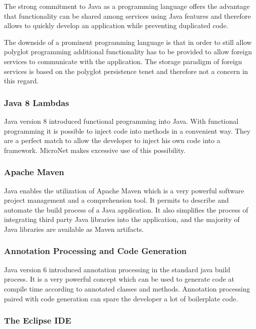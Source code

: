 The strong commitment to Java as a programming language offers the
advantage that functionality can be shared among services using Java features
and therefore allows to quickly develop an application while preventing
duplicated code.

The downside of a prominent programming language is that in order to still allow
polyglot programming additional functionality has to be provided to allow
foreign services to communicate with the application. The storage paradigm of
foreign services is based on the polyglot persistence tenet and therefore not a
concern in this regard.

\subsubsection{Java 8 Lambdas}

Java version 8 introduced functional programming into Java. With
functional programming it is possible to inject code into methods in a
convenient way. They are a perfect match to allow the developer to inject his
own code into a framework. MicroNet makes excessive use of this possibility.

\subsubsection{Apache Maven}

Java enables the utilization of Apache Maven which is a very powerful software
project management and a comprehension tool. It permits to describe and automate
the build process of a Java application. It also simplifies the process of
integrating third party Java libraries into the application, and the majority of
Java libraries are available as Maven artifacts.

\subsubsection{Annotation Processing and Code Generation}

Java version 6 introduced annotation processing in the standard java build
process. It is a very powerful concept which can be used to generate code at
compile time according to annotated classes and methods. Annotation processing
paired with code generation can spare the developer a lot of boilerplate code.

\subsubsection{The Eclipse IDE}

